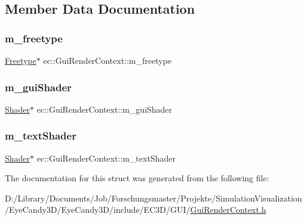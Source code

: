\subsection{Member Data Documentation}
\mbox{\label{structec_1_1_gui_render_context_aca121abf7990be17623ef5e34519b768}} 
\subsubsection{\texorpdfstring{m\+\_\+freetype}{m\_freetype}}
{\footnotesize\ttfamily \mbox{\hyperlink{classec_1_1_freetype}{Freetype}}$\ast$ ec\+::\+Gui\+Render\+Context\+::m\+\_\+freetype}

\mbox{\label{structec_1_1_gui_render_context_a3e84bcc858adbf27c4b8503d5f960047}} 
\subsubsection{\texorpdfstring{m\+\_\+gui\+Shader}{m\_guiShader}}
{\footnotesize\ttfamily \mbox{\hyperlink{classec_1_1_shader}{Shader}}$\ast$ ec\+::\+Gui\+Render\+Context\+::m\+\_\+gui\+Shader}

\mbox{\label{structec_1_1_gui_render_context_aa42aa86b9e3f12b973329494a3c89f90}} 
\subsubsection{\texorpdfstring{m\+\_\+text\+Shader}{m\_textShader}}
{\footnotesize\ttfamily \mbox{\hyperlink{classec_1_1_shader}{Shader}}$\ast$ ec\+::\+Gui\+Render\+Context\+::m\+\_\+text\+Shader}



The documentation for this struct was generated from the following file\+:\begin{DoxyCompactItemize}
\item 
D\+:/\+Library/\+Documents/\+Job/\+Forschungsmaster/\+Projekte/\+Simulation\+Visualization/\+Eye\+Candy3\+D/\+Eye\+Candy3\+D/include/\+E\+C3\+D/\+G\+U\+I/\mbox{\hyperlink{_gui_render_context_8h}{Gui\+Render\+Context.\+h}}\end{DoxyCompactItemize}

